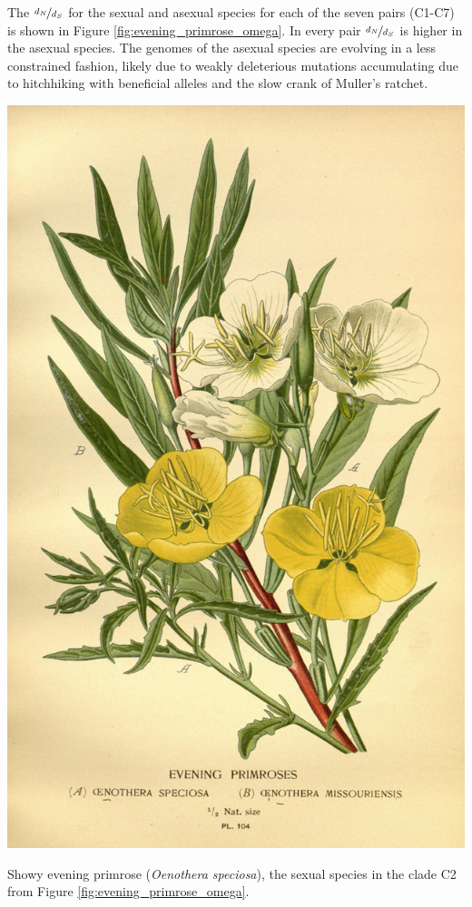 The $\nicefrac{d_N}{d_S}$ for the sexual and asexual species for each of the seven pairs (C1-C7) is shown in Figure \ref{fig:evening_primrose_omega}. In every pair $\nicefrac{d_N}{d_S}$ is higher in the asexual species. The genomes of the asexual species are evolving in a less constrained fashion, likely due to weakly deleterious mutations accumulating due to hitchhiking with beneficial alleles and the slow crank of Muller's ratchet. 
\begin{marginfigure}[0cm]
\begin{center}
  \includegraphics[width = \textwidth]{illustration_images/multiple_sel_loci/Evening_primrose/10575005313_f2c8839a80_k.jpg}
\end{center}
\caption{ Showy evening primrose ({\it Oenothera speciosa}), the sexual species in the clade C2 from Figure \ref{fig:evening_primrose_omega}.  } \label{}  %
\end{marginfigure}

